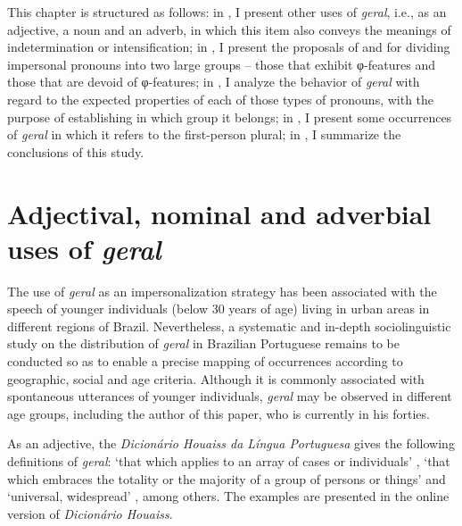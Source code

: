 \documentclass[output=paper]{langscibook}
\begin{document}
This chapter is structured as follows: in , I present other uses of \textit{geral}, i.e., as an adjective, a noun and an adverb, in which this item also conveys the meanings of indetermination or intensification; in , I present the proposals of \citet{Egerland2003} and \citet{Fenger2018} for dividing impersonal pronouns into two large groups – those that exhibit φ-fea\-tures and those that are devoid of φ-fea\-tures; in , I analyze the behavior of \textit{geral} with regard to the expected properties of each of those types of pronouns, with the purpose of establishing in which group it belongs; in , I present some occurrences of \textit{geral} {in which it refers to the first-person plural; in , I summarize the conclusions of this study.}

\section{Adjectival, nominal and adverbial uses of \textit{geral}}\label{sec:avelar:2}

{The use of} \textit{geral} as an impersonalization strategy has been associated with the speech of younger individuals (below 30 years of age) living in urban areas in different regions of Brazil. Nevertheless, a systematic and in-depth sociolinguistic study on the distribution of \textit{geral} in Brazilian Portuguese remains to be conducted so as to enable a precise mapping of occurrences according to geographic, social and age criteria. Although it is commonly associated with spontaneous utterances of younger individuals, \textit{geral} may be observed in different age groups, including the author of this paper, who is currently in his forties. 

As an adjective, the \textit{Dicionário Houaiss da Língua Portuguesa} gives the following definitions of \textit{geral}: ‘that which applies to an array of cases or individuals’ , ‘that which embraces the totality or the majority of a group of persons or things’  and ‘universal, widespread’ , among others. The examples are presented in the online version of \textit{Dicionário Houaiss}.
\end{document}
